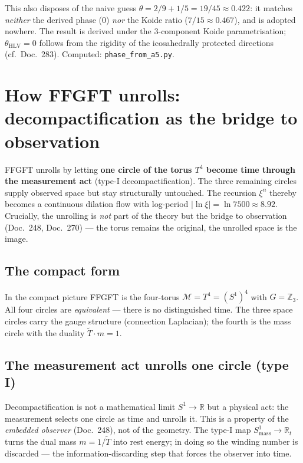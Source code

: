 \noindent This also disposes of the naive guess $\theta=2/9+1/5=19/45\approx0.422$: it
matches \emph{neither} the derived phase ($0$) \emph{nor} the Koide ratio
($7/15\approx0.467$), and is adopted nowhere. The result is derived under the $3$-component
Koide parametrisation; $\theta_{\mathrm{HLV}}=0$ follows from the rigidity of the
icosahedrally protected directions (cf.\ Doc.~283). Computed: \texttt{phase\_from\_a5.py}.

\section{How FFGFT unrolls: decompactification as the bridge to observation}
FFGFT unrolls by letting \textbf{one circle of the torus $T^4$ become time through the measurement
act} (type-I decompactification). The three remaining circles supply observed space but stay
structurally untouched. The recursion $\xi^n$ thereby becomes a continuous dilation flow with
log-period $|\ln\xi|=\ln 7500\approx 8.92$. Crucially, the unrolling is \emph{not} part of the
theory but the bridge to observation (Doc.~248, Doc.~270) --- the torus remains the original, the
unrolled space is the image.

\subsection{The compact form}
In the compact picture FFGFT is the four-torus $\mathcal{M}=T^4=(S^1)^4$ with $G=\mathbb{Z}_3$. All
four circles are \emph{equivalent} --- there is no distinguished time. The three space circles carry
the gauge structure (connection Laplacian); the fourth is the mass circle with the duality
$\tilde{T}\cdot m=1$.

\subsection{The measurement act unrolls one circle (type I)}
Decompactification is not a mathematical limit $S^1\to\mathbb{R}$ but a physical act: the measurement
selects one circle as time and unrolls it. This is a property of the \emph{embedded observer}
(Doc.~248), not of the geometry. The type-I map $S^1_{\text{mass}}\to\mathbb{R}_t$ turns the dual
mass $m=1/\tilde{T}$ into rest energy; in doing so the winding number is discarded --- the
information-discarding step that forces the observer into time.

